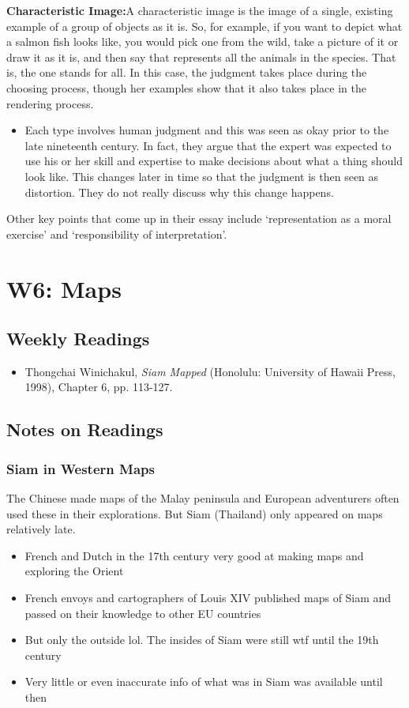 \documentclass[a4paper]{article}
\begin{document}
\bigskip

\noindent\textbf{Characteristic Image:}\quad A characteristic image is the image of a single, existing example of a group of objects as it is. So, for example, if you want to depict what a salmon fish looks like, you would pick one from the wild, take a picture of it or draw it as it is, and then say that represents all the animals in the species. That is, the one stands for all. In this case, the judgment takes place during the choosing process, though her examples show that it also takes place in the rendering process.
\begin{itemize}
	\item Each type involves human judgment and this was seen as okay prior to the late nineteenth century. In fact, they argue that the expert was expected to use his or her skill and expertise to make decisions about what a thing should look like. This changes later in time so that the judgment is then seen as distortion. They do not really discuss why this change happens.
\end{itemize}
\noindent Other key points that come up in their essay include `representation as a moral exercise' and `responsibility of interpretation'.

\newpage
\section{W6: Maps}
\subsection*{Weekly Readings}
\begin{itemize}
	\item Thongchai Winichakul, \textit{Siam Mapped} (Honolulu: University of Hawaii Press, 1998),
	Chapter 6, pp. 113-127.
\end{itemize}

\subsection{Notes on Readings}
\subsubsection{Siam in Western Maps}
The Chinese made maps of the Malay peninsula and European adventurers often used these in their explorations. But Siam (Thailand) only appeared on maps relatively late.
\begin{itemize}
	\item French and Dutch in the 17th century very good at making maps and exploring the Orient
	\item French envoys and cartographers of Louis XIV published maps of Siam and passed on their knowledge to other EU countries
	\item But only the outside lol. The insides of Siam were still wtf until the 19th century
	\item Very little or even inaccurate info of what was in Siam was available until then
\end{itemize}
\end{document}
